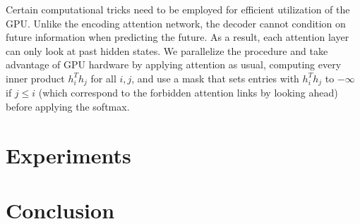 \documentclass[12pt]{article}
\begin{document}
Certain computational tricks need to be employed for efficient utilization of
the GPU. Unlike the encoding attention network, the decoder cannot condition on
future information when predicting the future. As a result, each attention layer
can only look at past hidden states. We parallelize the procedure and take
advantage of GPU hardware by applying attention as usual, computing every
inner product $h_i^T h_j$ for all $i,j$, and use a mask that sets entries with
$h_i^T h_j$
to $-\infty$ if $j \le i$ (which correspond to the forbidden attention
links by looking ahead) before applying the softmax. 

\section{Experiments}
\section{Conclusion}




\end{document}
